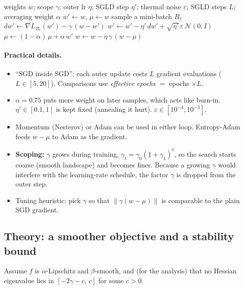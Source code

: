 \documentclass[11pt]{article}
\newcommand{\N}{\mathcal{N}}
\theoremstyle{plain}
\begin{document}
\begin{algorithm}[h]
\caption{Entropy-SGD (one outer step)}
\begin{algorithmic}[1]
\Require weights $w$; scope $\gamma$; outer lr $\eta$; SGLD step $\eta'$; thermal noise $\varepsilon$; SGLD steps $L$; averaging weight $\alpha$
\State $w' \gets w$, \; $\mu \gets w$
  \State sample a mini-batch $B_\ell$
  \State $dw' \gets \nabla L_{B_\ell}(w') - \gamma\,(w - w')$
  \State $w' \gets w' - \eta'\, dw' + \sqrt{\eta'}\,\varepsilon\,\N(0,I)$
  \State $\mu \gets (1-\alpha)\,\mu + \alpha\, w'$
\EndFor
\State $w \gets w - \eta\,\gamma\,(w - \mu)$ 
\end{algorithmic}
\end{algorithm}

\paragraph{Practical details.}
\begin{itemize}
  \item ``SGD inside SGD'': each outer update costs $L$ gradient evaluations ($L \in [5, 20]$). Comparisons use \emph{effective epochs} $=$ epochs $\times L$.
  \item $\alpha = 0.75$ puts more weight on later samples, which acts like burn-in. $\eta' \in [0.1, 1]$ is kept fixed (annealing it hurt).
        $\varepsilon \in [10^{-4}, 10^{-3}]$.
  \item Momentum (Nesterov) or Adam can be used in either loop. Entropy-Adam feeds $w - \mu$ to Adam as the gradient.
  \item \textbf{Scoping:} $\gamma$ grows during training, $\gamma_t = \gamma_0 (1+\gamma_1)^t$, so the search starts coarse (smooth landscape) and becomes finer.
        Because a growing $\gamma$ would interfere with the learning-rate schedule, the factor $\gamma$ is dropped from the outer step.
  \item Tuning heuristic: pick $\gamma$ so that $\|\gamma(w-\mu)\|$ is comparable to the plain SGD gradient.
\end{itemize}

\subsection{Theory: a smoother objective and a stability bound}

Assume $f$ is $\alpha$-Lipschitz and $\beta$-smooth, and (for the analysis) that no Hessian eigenvalue lies in $[-2\gamma - c,\, c]$ for some $c>0$.
\end{document}
